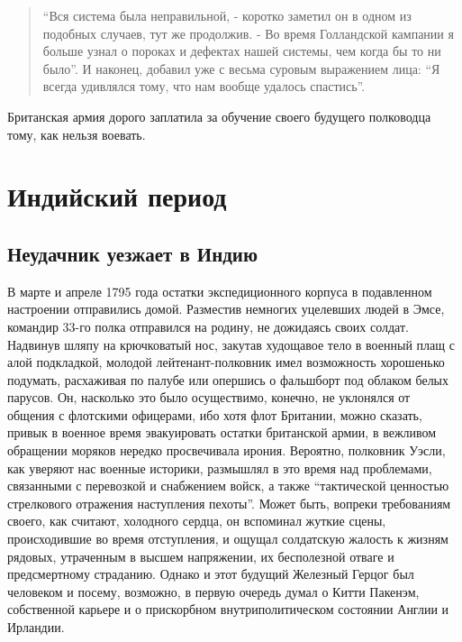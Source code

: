 \documentclass[
  oneside,
  12pt,
  titlepage]{book}
\begin{document}
\begin{quote}
``Вся система была неправильной, - коротко заметил он в одном из подобных случаев, тут же продолжив. - Во время Голландской кампании я больше узнал о пороках и дефектах нашей системы, чем когда бы то ни было''. И наконец, добавил уже с весьма суровым выражением лица: ``Я всегда удивлялся тому, что нам вообще удалось спастись''.
\end{quote}

Британская армия дорого заплатила за обучение своего будущего полководца тому, как нельзя воевать.

\hypertarget{part-ux438ux43dux434ux438ux439ux441ux43aux438ux439-ux43fux435ux440ux438ux43eux434}{%
\part*{Индийский период}\label{part-ux438ux43dux434ux438ux439ux441ux43aux438ux439-ux43fux435ux440ux438ux43eux434}}

\hypertarget{ux43dux435ux443ux434ux430ux447ux43dux438ux43a-ux443ux435ux437ux436ux430ux435ux442-ux432-ux438ux43dux434ux438ux44e}{%
\chapter{Неудачник уезжает в Индию}\label{ux43dux435ux443ux434ux430ux447ux43dux438ux43a-ux443ux435ux437ux436ux430ux435ux442-ux432-ux438ux43dux434ux438ux44e}}

В марте и апреле 1795 года остатки экспедиционного корпуса в подавленном настроении отправились домой. Разместив немногих уцелевших людей в Эмсе, командир 33-го полка отправился на родину, не дожидаясь своих солдат. Надвинув шляпу на крючковатый нос, закутав худощавое тело в военный плащ с алой подкладкой, молодой лейтенант-полковник имел возможность хорошенько подумать, расхаживая по палубе или опершись о фальшборт под облаком белых парусов. Он, насколько это было осуществимо, конечно, не уклонялся от общения с флотскими офицерами, ибо хотя флот Британии, можно сказать, привык в военное время эвакуировать остатки британской армии, в вежливом обращении моряков нередко просвечивала ирония. Вероятно, полковник Уэсли, как уверяют нас военные историки, размышлял в это время над проблемами, связанными с перевозкой и снабжением войск, а также ``тактической ценностью стрелкового отражения наступления пехоты''. Может быть, вопреки требованиям своего, как считают, холодного сердца, он вспоминал жуткие сцены, происходившие во время отступления, и ощущал солдатскую жалость к жизням рядовых, утраченным в высшем напряжении, их бесполезной отваге и предсмертному страданию. Однако и этот будущий Железный Герцог был человеком и посему, возможно, в первую очередь думал о Китти Пакенэм, собственной карьере и о прискорбном внутриполитическом состоянии Англии и Ирландии.
\end{document}
